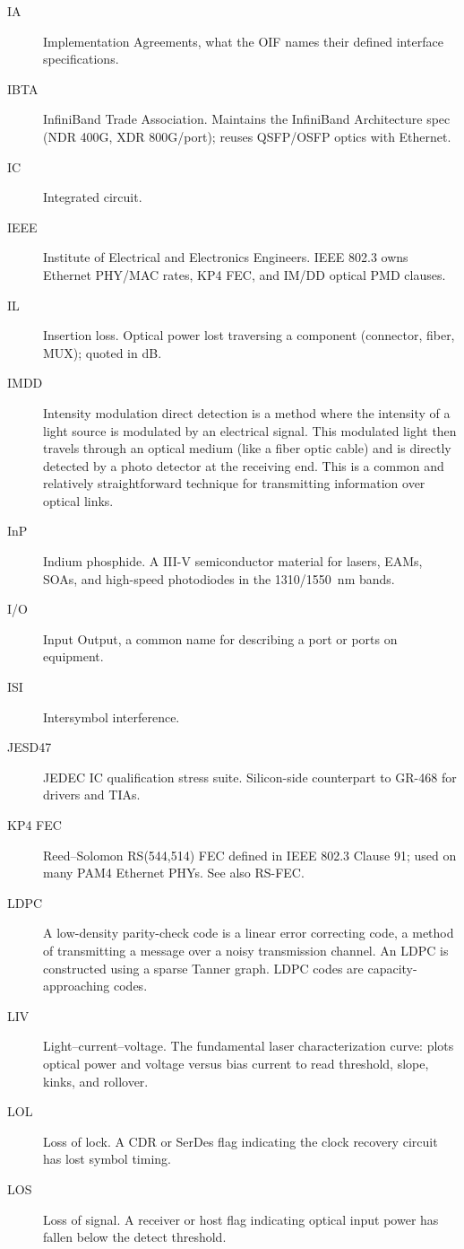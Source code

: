 \begin{description}
\item[IA] Implementation Agreements, what the OIF names their defined interface specifications.
\item[IBTA] InfiniBand Trade Association. Maintains the InfiniBand Architecture spec (NDR 400G, XDR 800G/port); reuses QSFP/OSFP optics with Ethernet.
\item[IC] Integrated circuit.
\item[IEEE] Institute of Electrical and Electronics Engineers. IEEE 802.3 owns Ethernet PHY/MAC rates, KP4 FEC, and IM/DD optical PMD clauses.
\item[IL] Insertion loss. Optical power lost traversing a component (connector, fiber, MUX); quoted in dB.
\item[IMDD] Intensity modulation direct detection is a method where the intensity of a light source is modulated by an electrical signal. This modulated light then travels through an optical medium (like a fiber optic cable) and is directly detected by a photo detector at the receiving end. This is a common and relatively straightforward technique for transmitting information over optical links.
\item[InP] Indium phosphide. A III-V semiconductor material for lasers, EAMs, SOAs, and high-speed photodiodes in the 1310/1550~nm bands.
\item[I/O] Input Output, a common name for describing a port or ports on equipment.
\item[ISI] Intersymbol interference.
\item[JESD47] JEDEC IC qualification stress suite. Silicon-side counterpart to GR-468 for drivers and TIAs.
\item[KP4 FEC] Reed--Solomon RS(544,514) FEC defined in IEEE 802.3 Clause 91; used on many PAM4 Ethernet PHYs. See also RS-FEC.
\item[LDPC] A low-density parity-check code is a linear error correcting code, a method of transmitting a message over a noisy transmission channel. An LDPC is constructed using a sparse Tanner graph. LDPC codes are capacity-approaching codes.
\item[LIV] Light--current--voltage. The fundamental laser characterization curve: plots optical power and voltage versus bias current to read threshold, slope, kinks, and rollover.
\item[LOL] Loss of lock. A CDR or SerDes flag indicating the clock recovery circuit has lost symbol timing.
\item[LOS] Loss of signal. A receiver or host flag indicating optical input power has fallen below the detect threshold.

\end{description}
